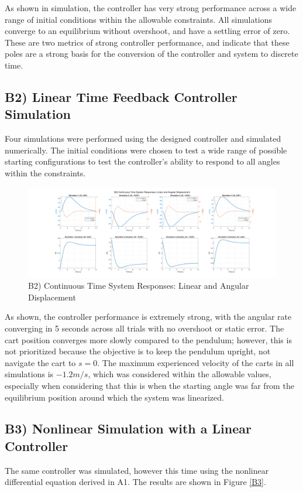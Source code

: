 \documentclass{article}
\begin{document}
As shown in simulation, the controller has very strong performance across a wide range of initial conditions within the allowable constraints. All simulations converge to an equilibrium without overshoot, and have a settling error of zero. These are two metrics of strong controller performance, and indicate that these poles are a strong basis for the conversion of the controller and system to discrete time.

\subsection*{B2) Linear Time Feedback Controller Simulation}
Four simulations were performed using the designed controller and simulated numerically. The initial conditions were chosen to test a wide range of possible starting configurations to test the controller's ability to respond to all angles within the constraints.

\begin{figure}[H]
    \centering
    \includegraphics[width=\textwidth]{figures/b2.png}
    \caption{B2) Continuous Time System Responses: Linear and Angular Displacement}
    \label{b2}
\end{figure}

As shown, the controller performance is extremely strong, with the angular rate converging in 5 seconds across all trials with no overshoot or static error. The cart position converges more slowly compared to the pendulum; however, this is not prioritized because the objective is to keep the pendulum upright, not navigate the cart to $s=0$. The maximum experienced velocity of the carts in all simulations is $-1.2m/s$, which was considered within the allowable values, especially when considering that this is when the starting angle was far from the equilibrium position around which the system was linearized. 

\subsection*{B3) Nonlinear Simulation with a Linear Controller}
The same controller was simulated, however this time using the nonlinear differential equation derived in A1. The results are shown in Figure \ref{B3}.
\end{document}
